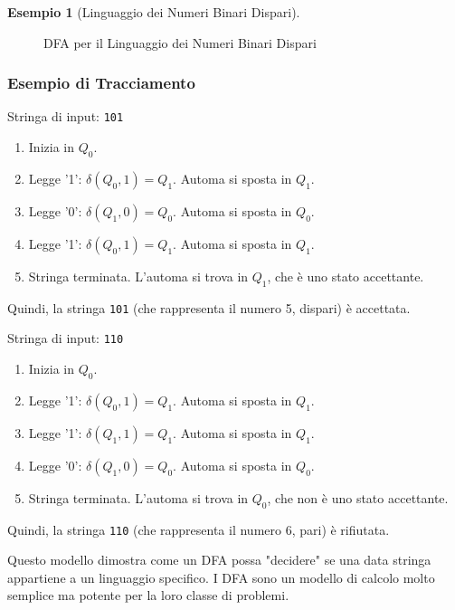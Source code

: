 \documentclass[a4paper]{article}
\theoremstyle{definition} %
\newtheorem{example}{Esempio}
\begin{document}
\begin{example}[Linguaggio dei Numeri Binari Dispari]
\begin{figure}[h!]
    \caption{DFA per il Linguaggio dei Numeri Binari Dispari}
\end{figure}

\subsubsection{Esempio di Tracciamento}
Stringa di input: \texttt{101}
\begin{enumerate}
    \item Inizia in $Q_0$.
    \item Legge '1': $\delta(Q_0, 1) = Q_1$. Automa si sposta in $Q_1$.
    \item Legge '0': $\delta(Q_1, 0) = Q_0$. Automa si sposta in $Q_0$.
    \item Legge '1': $\delta(Q_0, 1) = Q_1$. Automa si sposta in $Q_1$.
    \item Stringa terminata. L'automa si trova in $Q_1$, che è uno stato accettante.
\end{enumerate}
Quindi, la stringa \texttt{101} (che rappresenta il numero 5, dispari) è accettata.

Stringa di input: \texttt{110}
\begin{enumerate}
    \item Inizia in $Q_0$.
    \item Legge '1': $\delta(Q_0, 1) = Q_1$. Automa si sposta in $Q_1$.
    \item Legge '1': $\delta(Q_1, 1) = Q_1$. Automa si sposta in $Q_1$.
    \item Legge '0': $\delta(Q_1, 0) = Q_0$. Automa si sposta in $Q_0$.
    \item Stringa terminata. L'automa si trova in $Q_0$, che non è uno stato accettante.
\end{enumerate}
Quindi, la stringa \texttt{110} (che rappresenta il numero 6, pari) è rifiutata.

Questo modello dimostra come un DFA possa "decidere" se una data stringa appartiene a un linguaggio specifico. I DFA sono un modello di calcolo molto semplice ma potente per la loro classe di problemi.
\end{example}
\end{document}
